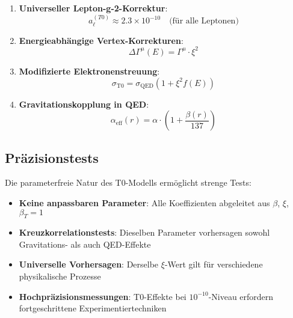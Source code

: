 \documentclass[12pt,a4paper]{article}
\begin{document}
\begin{enumerate}
	\item \textbf{Universeller Lepton-g-2-Korrektur}:
	\begin{equation}
		a_{\ell}^{(T0)} \approx 2.3 \times 10^{-10} \quad \text{(für alle Leptonen)}
	\end{equation}
	
	\item \textbf{Energieabhängige Vertex-Korrekturen}:
	\begin{equation}
		\Delta \Gamma^{\mu}(E) = \Gamma^{\mu} \cdot \xi^2
		\label{eq:energieabhaengiger_vertex}
	\end{equation}
	
	\item \textbf{Modifizierte Elektronenstreuung}:
	\begin{equation}
		\sigma_{\text{T0}} = \sigma_{\text{QED}} \left(1 + \xi^2 f(E)\right)
		\label{eq:modifizierte_streuung}
	\end{equation}
	
	\item \textbf{Gravitationskopplung in QED}:
	\begin{equation}
		\alpha_{\text{eff}}(r) = \alpha \cdot \left(1 + \frac{\beta(r)}{137}\right)
		\label{eq:gravitationskopplung}
	\end{equation}
\end{enumerate}

\subsection{Präzisionstests}
\label{subsec:praezisionstests}

Die parameterfreie Natur des T0-Modells ermöglicht strenge Tests:

\begin{itemize}
	\item \textbf{Keine anpassbaren Parameter}: Alle Koeffizienten abgeleitet aus $\beta$, $\xi$, $\beta_T = 1$
	\item \textbf{Kreuzkorrelationstests}: Dieselben Parameter vorhersagen sowohl Gravitations- als auch QED-Effekte
	\item \textbf{Universelle Vorhersagen}: Derselbe $\xi$-Wert gilt für verschiedene physikalische Prozesse
	\item \textbf{Hochpräzisionsmessungen}: T0-Effekte bei $10^{-10}$-Niveau erfordern fortgeschrittene Experimentiertechniken
\end{itemize}
\end{document}
